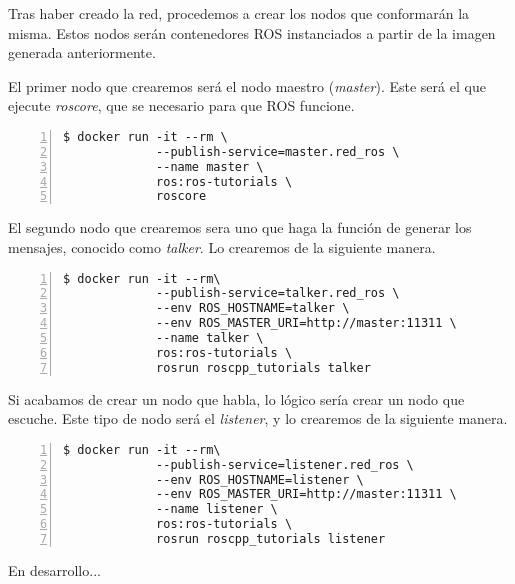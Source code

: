 	Tras haber creado la red, procedemos a crear los nodos que conformarán la misma. Estos nodos serán contenedores ROS instanciados a partir de la imagen generada anteriormente.
	
{\color{red}


	El primer nodo que crearemos será el nodo maestro (\emph{master}). Este será el que ejecute \emph{roscore}, que se necesario para que ROS funcione.

	\begin{lstlisting}[style=consola,numbers=left]
$ docker run -it --rm \
             --publish-service=master.red_ros \
             --name master \
             ros:ros-tutorials \
             roscore
	\end{lstlisting}
	

	El segundo nodo que crearemos sera uno que haga la función de generar los mensajes, conocido como \emph{talker}. Lo crearemos de la siguiente manera.
		
	\begin{lstlisting}[style=consola,numbers=left]
$ docker run -it --rm\
             --publish-service=talker.red_ros \
             --env ROS_HOSTNAME=talker \
             --env ROS_MASTER_URI=http://master:11311 \
             --name talker \
             ros:ros-tutorials \
             rosrun roscpp_tutorials talker
	\end{lstlisting}
	

	Si acabamos de crear un nodo que habla, lo lógico sería crear un nodo que escuche. Este tipo de nodo será el \emph{listener}, y lo crearemos de la siguiente manera.

	\begin{lstlisting}[style=consola,numbers=left]
$ docker run -it --rm\
             --publish-service=listener.red_ros \
             --env ROS_HOSTNAME=listener \
             --env ROS_MASTER_URI=http://master:11311 \
             --name listener \
             ros:ros-tutorials \
             rosrun roscpp_tutorials listener
	\end{lstlisting}
	
	En desarrollo...
}

